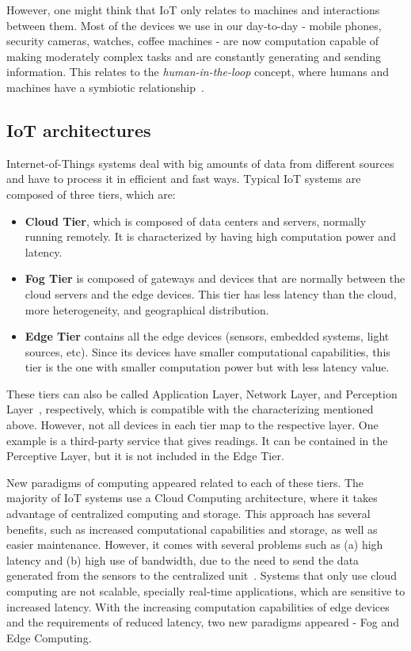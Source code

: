However, one might think that IoT only relates to machines and interactions between them. Most of the devices we use in our day-to-day - mobile phones, security cameras, watches, coffee machines - are now computation capable of making moderately complex tasks and are constantly generating and sending information. This relates to the \emph{human-in-the-loop} concept, where humans and machines have a symbiotic relationship~\cite{human_in_the_loop_survey}.
 
\subsection{IoT architectures}\label{sec:architectures}

Internet-of-Things systems deal with big amounts of data from different sources and have to process it in efficient and fast ways. Typical IoT systems are composed of three tiers, which are:

\begin{itemize}
    \item \textbf{Cloud Tier}, which is composed of data centers and servers, normally running remotely. It is characterized by having high computation power and latency.
    \item \textbf{Fog Tier} is composed of gateways and devices that are normally between the cloud servers and the edge devices. This tier has less latency than the cloud, more heterogeneity, and geographical distribution.
    \item \textbf{Edge Tier} contains all the edge devices (sensors, embedded systems, light sources, etc). Since its devices have smaller computational capabilities, this tier is the one with smaller computation power but with less latency value.
\end{itemize}

These tiers can also be called Application Layer, Network Layer, and Perception Layer~\cite{iot_layers}, respectively, which is compatible with the characterizing mentioned above. However, not all devices in each tier map to the respective layer. One example is a third-party service that gives readings. It can be contained in the Perceptive Layer, but it is not included in the Edge Tier.

New paradigms of computing appeared related to each of these tiers. The majority of IoT systems use a Cloud Computing architecture, where it takes advantage of centralized computing and storage. This approach has several benefits, such as increased computational capabilities and storage, as well as easier maintenance. However, it comes with several problems such as (a) high latency and (b) high use of bandwidth, due to the need to send the data generated from the sensors to the centralized unit~\cite{connecting_fog_and_cloud}. Systems that only use cloud computing are not scalable, specially real-time applications, which are sensitive to increased latency. With the increasing computation capabilities of edge devices and the requirements of reduced latency, two new paradigms appeared - Fog and Edge Computing.

